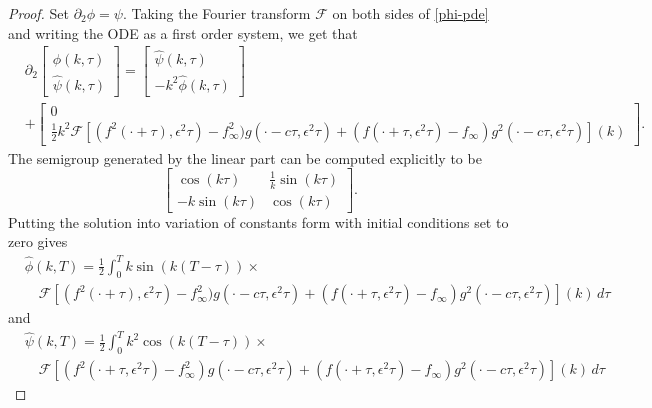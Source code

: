 \begin{proof}
	Set \(\partial_2 \phi = \psi\). Taking the Fourier transform \(\mathcal F\) on both sides of \cref{phi-pde} and writing the ODE as a first order system, we get that 
	\begin{equation*}
	\begin{aligned}
		&\partial_2 \begin{bmatrix} \hat \phi(k,\tau) \\ \hat \psi(k,\tau) \end{bmatrix} = \begin{bmatrix}\hat \psi(k,\tau) \\ -k^2 \hat\phi(k,\tau) \end{bmatrix} \\ &+ \begin{bmatrix}
			0 \\   \frac 1 2 k^2 \mathcal F[ (f^2(\cdot+\tau),\epsilon^2\tau)-f_\infty^2)g(\cdot-c\tau,\epsilon^2\tau) +(f(\cdot+\tau,\epsilon^2\tau)-f_\infty)g^2(\cdot-c\tau,\epsilon^2\tau)](k)
		\end{bmatrix}.
	\end{aligned}
	\end{equation*}
	The semigroup generated by the linear part can be computed explicitly to be
	\begin{equation*}
		\begin{bmatrix}
			\cos(k\tau)  & \frac 1 k \sin(k \tau) \\
			-k\sin(k\tau) & \cos(k\tau)
		\end{bmatrix}.
	\end{equation*} 
	Putting the solution into variation of constants form with initial conditions set to zero gives
	\begin{equation*}
	\begin{aligned}
		&\hat  \phi(k,T) = \frac 1 2 \int_0^Tk\sin(k(T-\tau)) \times\\
		&\quad\mathcal F[ (f^2(\cdot+\tau),\epsilon^2\tau)-f_\infty^2)g(\cdot-c\tau,\epsilon^2\tau) +(f(\cdot+\tau,\epsilon^2\tau)-f_\infty)g^2(\cdot-c\tau,\epsilon^2\tau)](k)\, d\tau
	\end{aligned}
	\end{equation*}
	and 
	\begin{equation}\label{psi-fourier-transform}
	\begin{aligned}
		&\hat  \psi(k,T) = \frac 1 2 \int_0^Tk^2\cos(k(T-\tau)) \times\\
		&\quad\mathcal F[ (f^2(\cdot+\tau,\epsilon^2\tau)-f_\infty^2)g(\cdot-c\tau,\epsilon^2\tau) +(f(\cdot+\tau,\epsilon^2\tau)-f_\infty)g^2(\cdot-c\tau,\epsilon^2\tau)](k)\, d\tau

\end{aligned}
\end{equation}
\end{proof}
